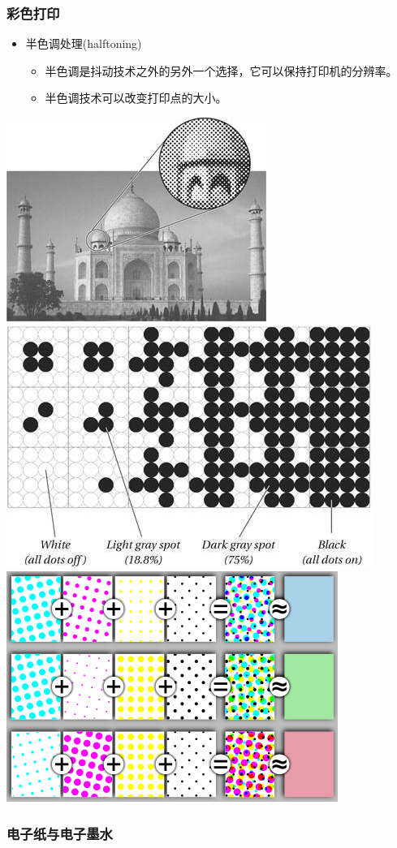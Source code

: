 \documentclass{beamer}
\newcommand{\fullPageImage}[2]{
	{
		\usebackgroundtemplate{\texttt{[image: \#1]}}
		\frame[plain]{#2}
	}
}
\begin{document}
\begin{frame}
	\frametitle{彩色打印}
	\begin{itemize}
		\item 半色调处理(halftoning)
		\begin{itemize}
			\item 半色调是抖动技术之外的另外一个选择，它可以保持打印机的分辨率。
			\item 半色调技术可以改变打印点的大小。
		\end{itemize}
	\end{itemize}
	\begin{center}
	\includegraphics[width=.3\textwidth]{images/halftoninggray1.jpg}
	\includegraphics[width=.3\textwidth]{images/halftoninggray.jpg}
	\includegraphics[width=.4\textwidth]{images/halftoningcolor.svg.png}
	\end{center}
\end{frame}

\subsubsection{电子纸与电子墨水}
\fullPageImage{images/ebooks.jpg}{\transwipe}
\fullPageImage{images/kindle-inside.jpg}{\transwipe}
\end{document}
